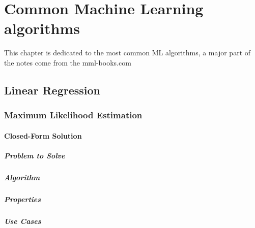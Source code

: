 \chapter{Common Machine Learning algorithms}\label{ch:introduction}

This chapter is dedicated to the most common ML algorithms, a major part of the notes come from the mml-books.com 

\section{Linear Regression}

\subsection{Maximum Likelihood Estimation}

\subsubsection*{Closed-Form Solution}

\paragraph*{Problem to Solve}

\paragraph*{Algorithm}

\paragraph*{Properties}

\paragraph*{Use Cases}


